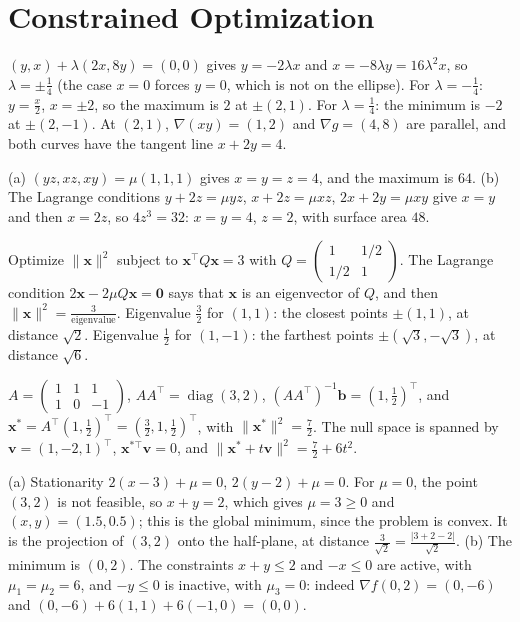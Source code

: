 \documentclass[11pt]{article}
\newcommand{\norm}[1]{\lVert #1 \rVert}
\DeclareMathOperator{\diag}{diag}
\begin{document}
\section*{Constrained Optimization}

\begin{description}[leftmargin=0pt, itemsep=0.3em]
    \item[\ref{pr:lagrange-ellipse}.] $(y, x) + \lambda(2x, 8y) = (0, 0)$ gives $y = -2\lambda x$ and $x = -8\lambda y = 16\lambda^2 x$, so $\lambda = \pm\frac{1}{4}$ (the case $x = 0$ forces $y = 0$, which is not on the ellipse). For $\lambda = -\frac{1}{4}$: $y = \frac{x}{2}$, $x = \pm 2$, so the maximum is $2$ at $\pm(2, 1)$. For $\lambda = \frac{1}{4}$: the minimum is $-2$ at $\pm(2, -1)$. At $(2, 1)$, $\nabla(xy) = (1, 2)$ and $\nabla g = (4, 8)$ are parallel, and both curves have the tangent line $x + 2y = 4$.
    \item[\ref{pr:max-xyz}.] (a) $(yz, xz, xy) = \mu(1, 1, 1)$ gives $x = y = z = 4$, and the maximum is $64$. (b) The Lagrange conditions $y + 2z = \mu yz$, $x + 2z = \mu xz$, $2x + 2y = \mu xy$ give $x = y$ and then $x = 2z$, so $4z^3 = 32$: $x = y = 4$, $z = 2$, with surface area $48$.
    \item[\ref{pr:distance-ellipse}.] Optimize $\norm{\mathbf{x}}^2$ subject to $\mathbf{x}^\top Q\mathbf{x} = 3$ with $Q = \begin{pmatrix} 1 & 1/2 \\ 1/2 & 1 \end{pmatrix}$. The Lagrange condition $2\mathbf{x} - 2\mu Q\mathbf{x} = \mathbf{0}$ says that $\mathbf{x}$ is an eigenvector of $Q$, and then $\norm{\mathbf{x}}^2 = \frac{3}{\text{eigenvalue}}$. Eigenvalue $\frac{3}{2}$ for $(1, 1)$: the closest points $\pm(1, 1)$, at distance $\sqrt{2}$. Eigenvalue $\frac{1}{2}$ for $(1, -1)$: the farthest points $\pm(\sqrt{3}, -\sqrt{3})$, at distance $\sqrt{6}$.
    \item[\ref{pr:min-norm-practice}.] $A = \begin{pmatrix} 1 & 1 & 1 \\ 1 & 0 & -1 \end{pmatrix}$, $AA^\top = \diag(3, 2)$, $(AA^\top)^{-1}\mathbf{b} = (1, \frac{1}{2})^\top$, and $\mathbf{x}^* = A^\top(1, \frac{1}{2})^\top = (\frac{3}{2}, 1, \frac{1}{2})^\top$, with $\norm{\mathbf{x}^*}^2 = \frac{7}{2}$. The null space is spanned by $\mathbf{v} = (1, -2, 1)^\top$, $\mathbf{x}^{*\top}\mathbf{v} = 0$, and $\norm{\mathbf{x}^* + t\mathbf{v}}^2 = \frac{7}{2} + 6t^2$.
    \item[\ref{pr:kkt-projection}.] (a) Stationarity $2(x - 3) + \mu = 0$, $2(y - 2) + \mu = 0$. For $\mu = 0$, the point $(3, 2)$ is not feasible, so $x + y = 2$, which gives $\mu = 3 \geq 0$ and $(x, y) = (1.5, 0.5)$; this is the global minimum, since the problem is convex. It is the projection of $(3, 2)$ onto the half-plane, at distance $\frac{3}{\sqrt{2}} = \frac{|3 + 2 - 2|}{\sqrt{2}}$. (b) The minimum is $(0, 2)$. The constraints $x + y \leq 2$ and $-x \leq 0$ are active, with $\mu_1 = \mu_2 = 6$, and $-y \leq 0$ is inactive, with $\mu_3 = 0$: indeed $\nabla f(0, 2) = (0, -6)$ and $(0, -6) + 6(1, 1) + 6(-1, 0) = (0, 0)$.

\end{description}
\end{document}
